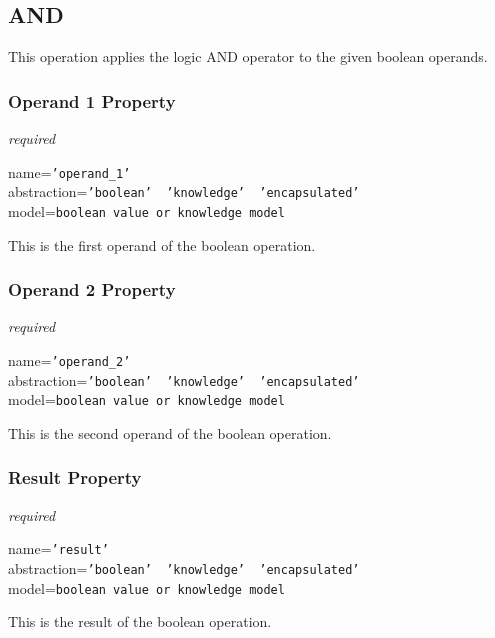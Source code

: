%
%
%
%
%
%

\subsection{AND}
\label{and_heading}

This operation applies the logic AND operator to the given boolean operands.

\subsubsection{Operand 1 Property}

\emph{required}

name=\texttt{'operand\_1'}\\
abstraction=\texttt{'boolean' \vline\ 'knowledge' \vline\ 'encapsulated'}\\
model=\texttt{boolean value or knowledge model}

This is the first operand of the boolean operation.

\subsubsection{Operand 2 Property}

\emph{required}

name=\texttt{'operand\_2'}\\
abstraction=\texttt{'boolean' \vline\ 'knowledge' \vline\ 'encapsulated'}\\
model=\texttt{boolean value or knowledge model}

This is the second operand of the boolean operation.

\subsubsection{Result Property}

\emph{required}

name=\texttt{'result'}\\
abstraction=\texttt{'boolean' \vline\ 'knowledge' \vline\ 'encapsulated'}\\
model=\texttt{boolean value or knowledge model}

This is the result of the boolean operation.
